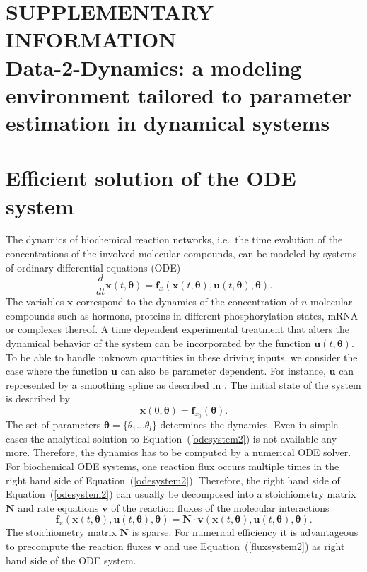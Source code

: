 \documentclass[12pt,a4paper]{scrartcl}
\newcommand{\DD}[2]{\frac{d #1}{d #2}}
\begin{document}
\section*{SUPPLEMENTARY INFORMATION\\Data-2-Dynamics: a modeling environment tailored to parameter estimation in dynamical systems}

\renewcommand*\contentsname{Contents}
\tableofcontents

\section{Efficient solution of the ODE system} \label{sec:ode_solvers}
The dynamics of biochemical reaction networks, i.e.~the time evolution of the concentra\-tions of the involved molecular compounds, can be modeled by systems of ordinary differential equations (ODE)
\begin{equation}
	\DD{}{t}{\mathbf{x}}(t, \boldsymbol{\theta}) = \mathbf{f}_{x}(\mathbf{x}(t, \boldsymbol{\theta}), \mathbf{u}(t, \boldsymbol{\theta}), \boldsymbol{\theta}). \label{odesystem2}
\end{equation}
The variables $\mathbf{x}$ correspond to the dynamics of the concentration of $n$ molecular compounds such as hormons, proteins in different phosphorylation states, mRNA or complexes thereof. A time dependent experimental treatment that alters the dynamical behavior of the system can be incorporated by the function $\mathbf{u}(t, \boldsymbol{\theta})$. To be able to handle unknown quantities in these driving inputs, we consider the case where the function $\mathbf{u}$ can also be parameter dependent. For instance, $\mathbf{u}$ can represented by a smoothing spline as described in \citet{Schelker:2012uq}. The initial state of the system is described by 
\begin{equation}
	\mathbf{x}(0, \boldsymbol{\theta}) = \mathbf{f}_{x_0}(\boldsymbol{\theta}). \label{init_ode_sys}
\end{equation}	
The set of parameters $\boldsymbol{\theta} = \{\theta_1 \dots \theta_l\}$ determines the  dynamics. Even in simple cases the analytical solution to Equation~(\ref{odesystem2}) is not available any more. Therefore, the dynamics has to be computed by a numerical ODE solver. For biochemical ODE systems, one reaction flux occurs multiple times in the right hand side of Equation~(\ref{odesystem2}). Therefore, the right hand side of Equation~(\ref{odesystem2}) can usually be decomposed into a stoichiometry matrix $\mathbf{N}$ and rate equations $\mathbf{v}$ of the reaction fluxes of the molecular interactions
\begin{equation}
	\mathbf{f}_{x}(\mathbf{x}(t, \boldsymbol{\theta}), \mathbf{u}(t, \boldsymbol{\theta}), \boldsymbol{\theta}) = \mathbf{N} \cdot \mathbf{v}(\mathbf{x}(t, \boldsymbol{\theta}), \mathbf{u}(t, \boldsymbol{\theta}), \boldsymbol{\theta}). \label{fluxsystem2}
\end{equation}
The stoichiometry matrix $\mathbf{N}$ is sparse. For numerical efficiency it is advantageous to precompute the reaction fluxes $\mathbf{v}$ and use Equation~(\ref{fluxsystem2}) as right hand side of the ODE system. 
\end{document}
